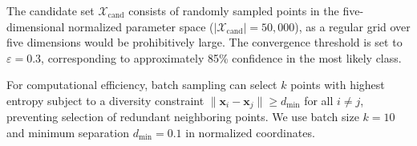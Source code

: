 \documentclass[a4paper,fleqn]{cas-dc}
\begin{document}
The candidate set $\mathcal{X}_{\text{cand}}$ consists of randomly sampled points in the five-dimensional normalized parameter space ($|\mathcal{X}_{\text{cand}}| = 50{,}000$), as a regular grid over five dimensions would be prohibitively large. The convergence threshold is set to $\varepsilon = 0.3$, corresponding to approximately 85\% confidence in the most likely class.

For computational efficiency, batch sampling can select $k$ points with highest entropy subject to a diversity constraint $\|\mathbf{x}_i - \mathbf{x}_j\| \geq d_{\min}$ for all $i \neq j$, preventing selection of redundant neighboring points. We use batch size $k = 10$ and minimum separation $d_{\min} = 0.1$ in normalized coordinates.

\printcredits

%





\end{document}

